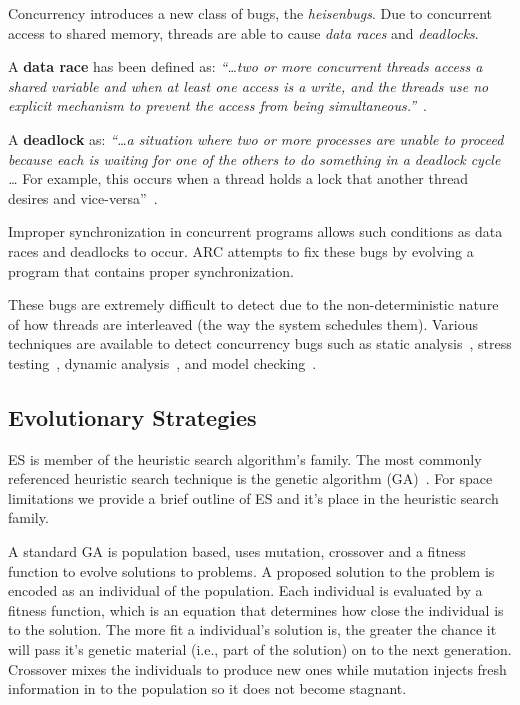 \documentclass{llncs}
\begin{document}
Concurrency introduces a new class of bugs, the \textit{heisenbugs}. Due to
concurrent access to shared memory, threads are able to cause \textit{data
races} and \textit{deadlocks}.

A \textbf{data race} has been defined as: \textit{``\ldots two or more
concurrent threads access a shared variable and when at least one access is a
write, and the threads use no explicit mechanism to prevent the access from
being simultaneous.''}~\cite{LSW07}.

A \textbf{deadlock} as: \textit{``\ldots a situation where two or more
processes are unable to proceed because each is waiting for one of the others
to do something in a deadlock cycle \ldots} For example, this occurs when a
thread holds a lock that another thread desires and vice-versa''~\cite{LSW07}.

Improper synchronization in concurrent programs allows such conditions as data
races and deadlocks to occur. ARC attempts to fix these bugs by evolving a
program that contains proper synchronization.

These bugs are extremely difficult to detect due to the non-deterministic
nature of how threads are interleaved (the way the system schedules them).
Various techniques are available to detect concurrency bugs such as static
analysis~\cite{NA07,NPSG09,HP04}, stress testing~\cite{HSU03}, dynamic
analysis~\cite{JNPS09,EFN+02}, and model
checking~\cite{BHPV00,RDH03,OM03,MQB07,Holz97,JM04,HP00}.

\subsection{Evolutionary Strategies}
\label{sec:evolutionary_strategies}

ES is member of the heuristic search algorithm's family. The most commonly
referenced heuristic search technique is the genetic algorithm
(GA)~\cite{GA92}. For space limitations we provide a brief outline of ES and
it's place in the heuristic search family.

A standard GA is population based, uses mutation, crossover and
a fitness function to evolve solutions to problems. A proposed solution to the
problem is encoded as an individual of the population. Each individual is evaluated by a
fitness function, which is an equation that determines how close the individual is to the solution. The more fit a individual's solution is, the greater the chance it
will pass it's genetic material (i.e., part of the solution) on to the next generation.
Crossover mixes the individuals to produce new ones while mutation injects fresh
information in to the population so it does not become stagnant.
\end{document}
